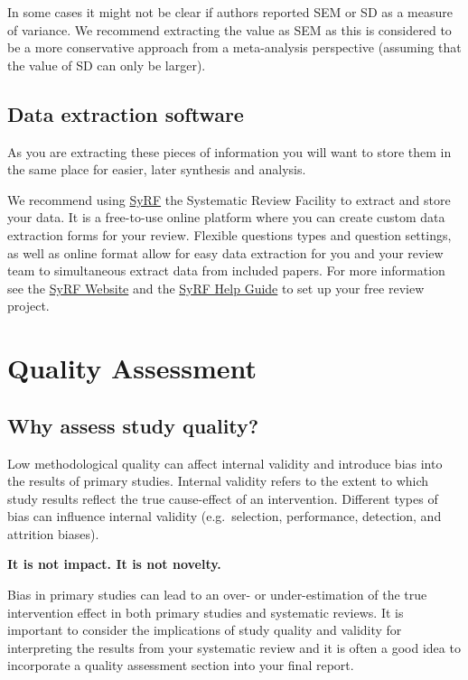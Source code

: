 \documentclass[
]{book}
\begin{document}
In some cases it might not be clear if authors reported SEM or SD as a measure of variance. We recommend extracting the value as SEM as this is considered to be a more conservative approach from a meta-analysis perspective (assuming that the value of SD can only be larger).

\section{Data extraction software}\label{data-extraction-software}

As you are extracting these pieces of information you will want to store them in the same place for easier, later synthesis and analysis.

We recommend using \href{https://syrf.org.uk/}{SyRF} the Systematic Review Facility to extract and store your data. It is a free-to-use online platform where you can create custom data extraction forms for your review. Flexible questions types and question settings, as well as online format allow for easy data extraction for you and your review team to simultaneous extract data from included papers. For more information see the \href{https://syrf.org.uk/}{SyRF Website} and the \href{https://help.syrf.org.uk/}{SyRF Help Guide} to set up your free review project.

\chapter{Quality Assessment}\label{quality-assessment}

\section{Why assess study quality?}\label{why-assess-study-quality}

Low methodological quality can affect internal validity and introduce bias into the results of primary studies. Internal validity refers to the extent to which study results reflect the true cause-effect of an intervention. Different types of bias can influence internal validity (e.g.~selection, performance, detection, and attrition biases).

\textbf{It is not impact. It is not novelty.}

Bias in primary studies can lead to an over- or under-estimation of the true intervention effect in both primary studies and systematic reviews. It is important to consider the implications of study quality and validity for interpreting the results from your systematic review and it is often a good idea to incorporate a quality assessment section into your final report.
\end{document}
